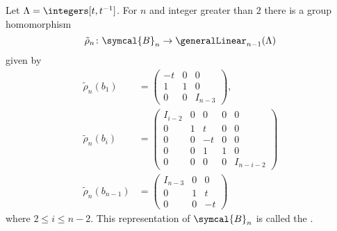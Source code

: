 \documentclass[fleqn]{NotesClass}
\newcommand{\braid}{\symcal{B}}
\begin{document}
    \begin{prp}{}{}
        Let \(\Lambda = \integers[t, t^{-1}]\).
        For \(n\) and integer greater than \(2\) there is a group homomorphism
        \begin{equation}
            \tilde{\rho}_n \colon \braid_n \to \generalLinear_{n-1}(\Lambda)
        \end{equation}
        given by
        \begin{align}
            \tilde{\rho}_n(b_1) &= 
            \begin{pmatrix}
                -t & 0 & 0\\
                1 & 1 & 0\\
                0 & 0 & I_{n-3}
            \end{pmatrix}
            ,\\
            \tilde{\rho}_n(b_i) &=
            \begin{pmatrix}
                I_{i-2} & 0 & 0 & 0 & 0\\
                0 & 1 & t & 0 & 0\\
                0 & 0 & -t & 0 & 0\\
                0 & 0 & 1 & 1 & 0\\
                0 & 0 & 0 & 0 & I_{n-i-2}
            \end{pmatrix}
            \\
            \tilde{\rho}_n(b_{n-1}) &= 
            \begin{pmatrix}
                I_{n-3} & 0 & 0\\
                0 & 1 & t\\
                0 & 0 & -t
            \end{pmatrix} 
        \end{align}
        where \(2 \le i \le n - 2\).
        This representation of \(\braid_n\) is called the .
    \end{prp}
    
\end{document}
